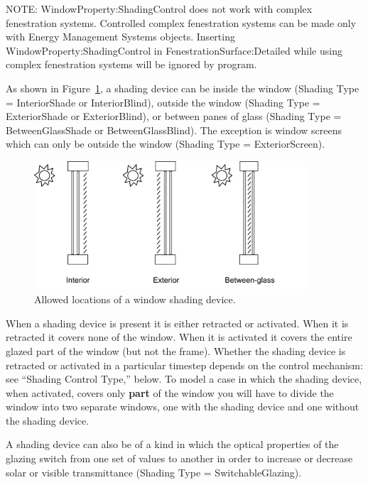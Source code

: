 NOTE: WindowProperty:ShadingControl does not work with complex fenestration systems. Controlled complex fenestration systems can be made only with Energy Management Systems objects. Inserting WindowProperty:ShadingControl in FenestrationSurface:Detailed while using complex fenestration systems will be ignored by program.

As shown in Figure~\ref{fig:allowed-locations-of-a-window-shading-device.}, a shading device can be inside the window (Shading Type = InteriorShade or InteriorBlind), outside the window (Shading Type = ExteriorShade or ExteriorBlind), or between panes of glass (Shading Type = BetweenGlassShade or BetweenGlassBlind). The exception is window screens which can only be outside the window (Shading Type = ExteriorScreen).

\begin{figure}[hbtp] %
\centering
\includegraphics[width=0.9\textwidth, height=0.9\textheight, keepaspectratio=true]{media/image060.png}
\caption{Allowed locations of a window shading device. \protect \label{fig:allowed-locations-of-a-window-shading-device.}}
\end{figure}

When a shading device is present it is either retracted or activated. When it is retracted it covers none of the window. When it is activated it covers the entire glazed part of the window (but not the frame). Whether the shading device is retracted or activated in a particular timestep depends on the control mechanism: see ``Shading Control Type,'' below. To model a case in which the shading device, when activated, covers only \textbf{part} of the window you will have to divide the window into two separate windows, one with the shading device and one without the shading device.

A shading device can also be of a kind in which the optical properties of the glazing switch from one set of values to another in order to increase or decrease solar or visible transmittance (Shading Type = SwitchableGlazing).

